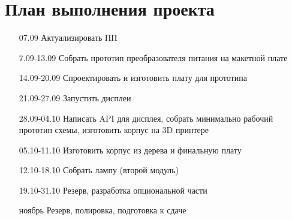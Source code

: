 \documentclass[a4paper,14pt]{extarticle}
\begin{document}
\section{План выполнения проекта}

\begin{enumerate}
	\item [07.09] Актуализировать ПП
	\item [7.09-13.09] Собрать прототип преобразователя питания на макетной плате
	\item [14.09-20.09] Спроектировать и изготовить плату для прототипа
	\item [21.09-27.09] Запустить дисплеи
	\item [28.09-04.10] Написать API для дисплея,
		собрать минимально рабочий прототип схемы,
		изготовить корпус на 3D принтере
	\item [05.10-11.10] Изготовить корпус из дерева и
		финальную плату
	\item [12.10-18.10] Собрать лампу (второй модуль)
	\item [19.10-31.10] Резерв, разработка опциональной части
	\item [ноябрь] Резерв, полировка, подготовка к сдаче
\end{enumerate}
\end{document}
